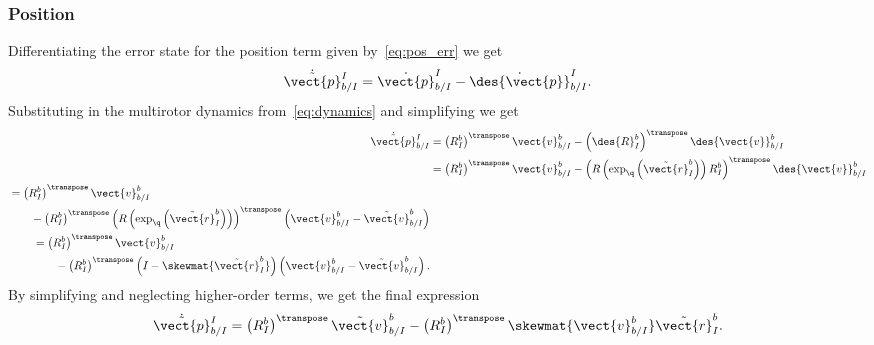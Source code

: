 \subsubsection{Position}

Differentiating the error state for the position term given
by~\eqref{eq:pos_err} we get
\begin{equation}
  \dot{\tilde{\vect{p}}}_{b/I}^{I} = \dot{\vect{p}}_{b/I}^{I} -
    \dot{\des{\vect{p}}}_{b/I}^{I}.
\end{equation}
Substituting in the multirotor dynamics from~\eqref{eq:dynamics} and simplifying
we get
\begin{align}
  \dot{\tilde{\vect{p}}}_{b/I}^{I} &= \left(R_{I}^{b}\right)^\transpose
  \vect{v}_{b/I}^{b} - \left(\des{R}_{I}^{b}\right)^\transpose
  \des{\vect{v}}_{b/I}^{b} \\ 
  &= \left(R_{I}^{b}\right)^\transpose
  \vect{v}_{b/I}^{b} -
  \left(R\left(\exp_{\q}\left(\tilde{\vect{r}}_{I}^{b}\right)\right) R_{I}^{b}\right)^\transpose
  \des{\vect{v}}_{b/I}^{b} \\
  \begin{split}
  &= \left(R_{I}^{b}\right)^\transpose
  \vect{v}_{b/I}^{b} \\
  & \qquad - \left(R_{I}^{b}\right)^\transpose
  \left(R\left(\exp_{\q}\left(\tilde{\vect{r}}_{I}^{b}\right)\right) \right)^\transpose
  \left(\vect{v}_{b/I}^{b} - \tilde{\vect{v}}_{b/I}^b\right) \\
  \end{split} \\
  \begin{split}
  &= \left(R_{I}^{b}\right)^\transpose
  \vect{v}_{b/I}^{b} \\
  & \qquad - \left(R_{I}^{b}\right)^\transpose
  \left( I - \skewmat{\tilde{\vect{r}}_I^b}\right)
  \left(\vect{v}_{b/I}^{b} - \tilde{\vect{v}}_{b/I}^{b}\right).
  \end{split}
\end{align}
By simplifying and neglecting higher-order terms, we get the final expression
\begin{equation}
  \dot{\tilde{\vect{p}}}_{b/I}^{I} = \left(R_{I}^{b}\right)^\transpose
  \tilde{\vect{v}}_{b/I}^{b} - \left(R_{I}^{b}\right)^\transpose
    \skewmat{\vect{v}_{b/I}^{b}} \tilde{\vect{r}}_I^b.
\end{equation}

